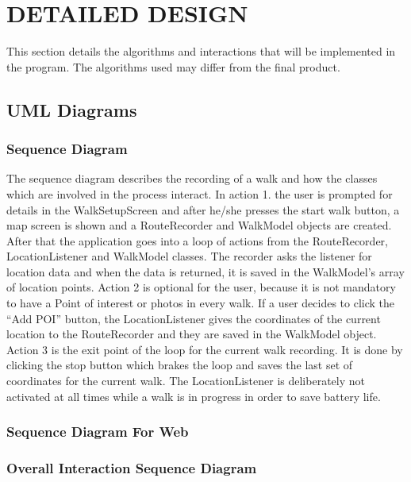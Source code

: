 \documentclass[12pt]{article}
\begin{document}
\section{DETAILED DESIGN}
This section details the algorithms and interactions that will be implemented in the program. The algorithms used may differ from the final product.
\subsection{UML Diagrams}
\subsubsection{Sequence Diagram}
The sequence diagram describes the recording of a walk and how the classes which are involved in the process interact.
In action 1. the user is prompted for details in the WalkSetupScreen and after he/she presses the start walk button, a map screen is shown and a RouteRecorder and WalkModel objects are created. After that the application goes into a loop of actions from the RouteRecorder, LocationListener and WalkModel classes. The recorder asks the listener for location data and when the data is returned, it is saved in the WalkModel's array of location points.
Action 2 is optional for the user, because it is not mandatory to have a Point of interest or photos in every walk. If a user decides to click the “Add POI” button, the LocationListener gives the coordinates of the current location to the RouteRecorder and they are saved in the WalkModel object.
Action 3 is the exit point of the loop for the current walk recording. It is done by clicking the stop button which brakes the loop and saves the last set of coordinates for the current walk.
The LocationListener is deliberately not activated at all times while a walk is in progress in order to save battery life.
\subsubsection{Sequence Diagram For Web}
\subsubsection{Overall Interaction Sequence Diagram}
\end{document}
